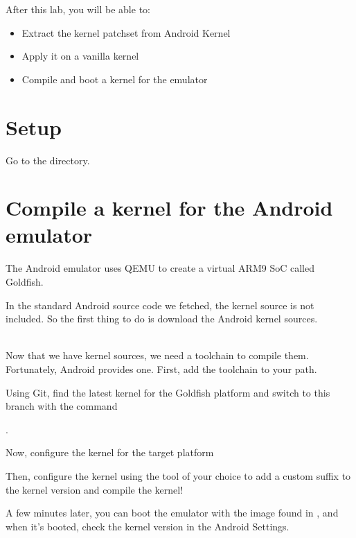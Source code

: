 
After this lab, you will be able to:
\begin{itemize}
  \item Extract the kernel patchset from Android Kernel
  \item Apply it on a vanilla kernel
  \item Compile and boot a kernel for the emulator
\end{itemize}

\section{Setup}

Go to the  directory.

\section{Compile a kernel for the Android emulator}

The Android emulator uses QEMU to create a virtual ARM9 SoC called Goldfish.

In the standard Android source code we fetched, the kernel source is not included.
So the first thing to do is download the Android kernel sources.

\\

Now that we have kernel sources, we need a toolchain to compile them. Fortunately,
Android provides one. First, add the toolchain to your path.


Using Git, find the latest kernel for the Goldfish platform
and switch to this branch with the command 

.

Now, configure the kernel for the target platform


Then, configure the kernel using the tool of your choice to add a custom suffix
to the kernel version and compile the kernel!


A few minutes later, you can boot the emulator with the image found in
, and when it's booted, check the kernel version in the
Android Settings.

